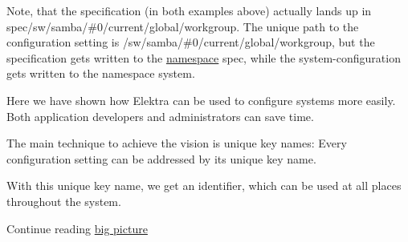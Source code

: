 Note, that the specification (in both examples above) actually lands up in {\ttfamily spec/sw/samba/\#0/current/global/workgroup}. The unique path to the configuration setting is {\ttfamily /sw/samba/\#0/current/global/workgroup}, but the specification gets written to the \hyperlink{doc_tutorials_namespaces_md}{namespace} {\ttfamily spec}, while the system-\/configuration gets written to the namespace {\ttfamily system}.

Here we have shown how Elektra can be used to configure systems more easily. Both application developers and administrators can save time.

The main technique to achieve the vision is unique key names\+: Every configuration setting can be addressed by its unique key name.

With this unique key name, we get an identifier, which can be used at all places throughout the system.


\begin{DoxyItemize}
\item Continue reading \hyperlink{doc_BIGPICTURE_md}{big picture} 
\end{DoxyItemize}